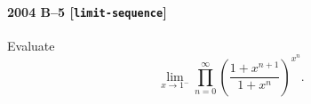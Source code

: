 \paragraph{2004 B--5 \textnormal{[\texttt{limit-sequence}]}}
Evaluate
\[
\lim_{x \to 1^-} \prod_{n=0}^\infty \left(\frac{1 + x^{n+1}}{1 +
x^n}\right)^{x^n}.
\]
